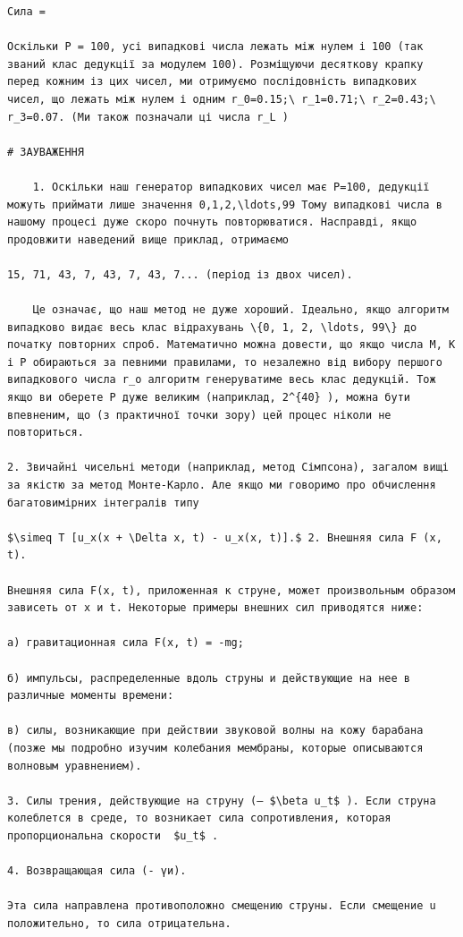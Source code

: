 \documentclass[
  ukrainian,
]{article}
\begin{document}
\begin{verbatim}
Сила =

Оскільки P = 100, усі випадкові числа лежать між нулем і 100 (так званий клас дедукції за модулем 100). Розміщуючи десяткову крапку перед кожним із цих чисел, ми отримуємо послідовність випадкових чисел, що лежать між нулем і одним r_0=0.15;\ r_1=0.71;\ r_2=0.43;\ r_3=0.07. (Ми також позначали ці числа r_L )

# ЗАУВАЖЕННЯ

    1. Оскільки наш генератор випадкових чисел має P=100, дедукції можуть приймати лише значення 0,1,2,\ldots,99 Тому випадкові числа в нашому процесі дуже скоро почнуть повторюватися. Насправді, якщо продовжити наведений вище приклад, отримаємо

15, 71, 43, 7, 43, 7, 43, 7... (період із двох чисел).

    Це означає, що наш метод не дуже хороший. Ідеально, якщо алгоритм випадково видає весь клас відрахувань \{0, 1, 2, \ldots, 99\} до початку повторних спроб. Математично можна довести, що якщо числа M, K і P обираються за певними правилами, то незалежно від вибору першого випадкового числа r_o алгоритм генеруватиме весь клас дедукцій. Тож якщо ви оберете P дуже великим (наприклад, 2^{40} ), можна бути впевненим, що (з практичної точки зору) цей процес ніколи не повториться.

2. Звичайні чисельні методи (наприклад, метод Сімпсона), загалом вищі за якістю за метод Монте-Карло. Але якщо ми говоримо про обчислення багатовимірних інтегралів типу

$\simeq T [u_x(x + \Delta x, t) - u_x(x, t)].$ 2. Внешняя сила F (x, t).

Внешняя сила F(x, t), приложенная к струне, может произвольным образом зависеть от x и t. Некоторые примеры внешних сил приводятся ниже:

а) гравитационная сила F(x, t) = -mg;

б) импульсы, распределенные вдоль струны и действующие на нее в различные моменты времени:

в) силы, возникающие при действии звуковой волны на кожу барабана (позже мы подробно изучим колебания мембраны, которые описываются волновым уравнением).

3. Силы трения, действующие на струну (— $\beta u_t$ ). Если струна колеблется в среде, то возникает сила сопротивления, которая пропорциональна скорости  $u_t$ .

4. Возвращающая сила (- үи).

Эта сила направлена противоположно смещению струны. Если смещение u положительно, то сила отрицательна.


\end{verbatim}
\end{document}
